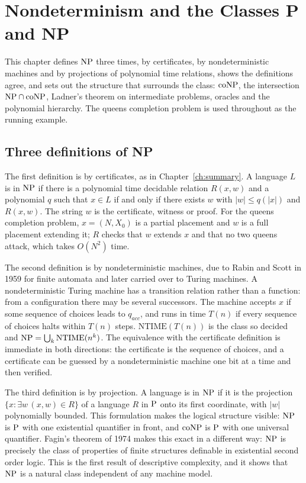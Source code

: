 \chapter{Nondeterminism and the Classes P and NP}
\label{ch:pnp}

This chapter defines $\mathrm{NP}$ three times, by certificates, by nondeterministic machines and by projections of polynomial time relations, shows the definitions agree, and sets out the structure that surrounds the class: $\mathrm{co}\mathrm{NP}$, the intersection $\mathrm{NP} \cap \mathrm{co}\mathrm{NP}$, Ladner's theorem on intermediate problems, oracles and the polynomial hierarchy. The queens completion problem is used throughout as the running example.

\section{Three definitions of NP}

The first definition is by certificates, as in Chapter~\ref{ch:summary}. A language $L$ is in $\mathrm{NP}$ if there is a polynomial time decidable relation $R(x, w)$ and a polynomial $q$ such that $x \in L$ if and only if there exists $w$ with $|w| \le q(|x|)$ and $R(x, w)$. The string $w$ is the certificate, witness or proof. For the queens completion problem, $x = (N, X_0)$ is a partial placement and $w$ is a full placement extending it; $R$ checks that $w$ extends $x$ and that no two queens attack, which takes $O(N^2)$ time.

The second definition is by nondeterministic machines, due to Rabin and Scott in 1959 for finite automata and later carried over to Turing machines. A nondeterministic Turing machine has a transition relation rather than a function: from a configuration there may be several successors. The machine accepts $x$ if some sequence of choices leads to $q_{acc}$, and runs in time $T(n)$ if every sequence of choices halts within $T(n)$ steps. $\mathrm{NTIME}(T(n))$ is the class so decided and $\mathrm{NP} = \bigcup_k \mathrm{NTIME}(n^k)$. The equivalence with the certificate definition is immediate in both directions: the certificate is the sequence of choices, and a certificate can be guessed by a nondeterministic machine one bit at a time and then verified.

The third definition is by projection. A language is in $\mathrm{NP}$ if it is the projection $\{ x : \exists w \, (x, w) \in R \}$ of a language $R$ in $\mathrm{P}$ onto its first coordinate, with $|w|$ polynomially bounded. This formulation makes the logical structure visible: $\mathrm{NP}$ is $\mathrm{P}$ with one existential quantifier in front, and $\mathrm{co}\mathrm{NP}$ is $\mathrm{P}$ with one universal quantifier. Fagin's theorem of 1974 makes this exact in a different way: $\mathrm{NP}$ is precisely the class of properties of finite structures definable in existential second order logic. This is the first result of descriptive complexity, and it shows that $\mathrm{NP}$ is a natural class independent of any machine model.

